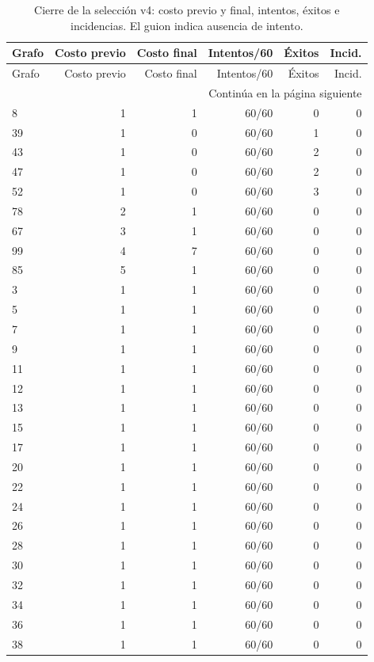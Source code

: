 \small\begin{longtable}{lrrrrr}
\caption{Cierre de la selección v4: costo previo y final, intentos, éxitos e incidencias. El guion indica ausencia de intento.}\label{tab:repairall}\\
\toprule Grafo & Costo previo & Costo final & Intentos/60 & Éxitos & Incid. \\ \midrule\endfirsthead
\toprule Grafo & Costo previo & Costo final & Intentos/60 & Éxitos & Incid. \\ \midrule\endhead
\midrule\multicolumn{6}{r}{Continúa en la página siguiente}\endfoot\bottomrule\endlastfoot
1 & 1 & 0 & 60/60 & 3 & 0 \\
8 & 1 & 1 & 60/60 & 0 & 0 \\
39 & 1 & 0 & 60/60 & 1 & 0 \\
43 & 1 & 0 & 60/60 & 2 & 0 \\
47 & 1 & 0 & 60/60 & 2 & 0 \\
52 & 1 & 0 & 60/60 & 3 & 0 \\
78 & 2 & 1 & 60/60 & 0 & 0 \\
67 & 3 & 1 & 60/60 & 0 & 0 \\
99 & 4 & 7 & 60/60 & 0 & 0 \\
85 & 5 & 1 & 60/60 & 0 & 0 \\
3 & 1 & 1 & 60/60 & 0 & 0 \\
5 & 1 & 1 & 60/60 & 0 & 0 \\
7 & 1 & 1 & 60/60 & 0 & 0 \\
9 & 1 & 1 & 60/60 & 0 & 0 \\
11 & 1 & 1 & 60/60 & 0 & 0 \\
12 & 1 & 1 & 60/60 & 0 & 0 \\
13 & 1 & 1 & 60/60 & 0 & 0 \\
15 & 1 & 1 & 60/60 & 0 & 0 \\
17 & 1 & 1 & 60/60 & 0 & 0 \\
20 & 1 & 1 & 60/60 & 0 & 0 \\
22 & 1 & 1 & 60/60 & 0 & 0 \\
24 & 1 & 1 & 60/60 & 0 & 0 \\
26 & 1 & 1 & 60/60 & 0 & 0 \\
28 & 1 & 1 & 60/60 & 0 & 0 \\
30 & 1 & 1 & 60/60 & 0 & 0 \\
32 & 1 & 1 & 60/60 & 0 & 0 \\
34 & 1 & 1 & 60/60 & 0 & 0 \\
36 & 1 & 1 & 60/60 & 0 & 0 \\
38 & 1 & 1 & 60/60 & 0 & 0 \\

\end{longtable}
